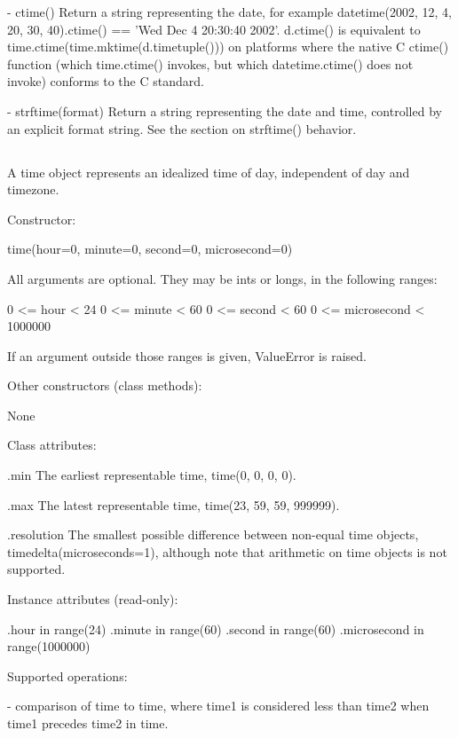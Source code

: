 {  - ctime()
    Return a string representing the date, for example
    datetime(2002, 12, 4, 20, 30, 40).ctime() == 'Wed Dec  4 20:30:40 2002'.
    d.ctime() is equivalent to time.ctime(time.mktime(d.timetuple()))
    on platforms where the native C ctime() function (which time.ctime()
    invokes, but which datetime.ctime() does not invoke) conforms to the
    C standard.

  - strftime(format)
    Return a string representing the date and time, controlled by an
    explicit format string.  See the section on strftime() behavior.


\subsection{ \label{datetime-time}}

A time object represents an idealized time of day, independent of day
and timezone.

Constructor:

    time(hour=0, minute=0, second=0, microsecond=0)

    All arguments are optional.  They may be ints or longs, in the
    following ranges:

        0 <= hour < 24
        0 <= minute < 60
        0 <= second < 60
        0 <= microsecond < 1000000

    If an argument outside those ranges is given, ValueError is raised.

Other constructors (class methods):

    None

Class attributes:

    .min
        The earliest representable time, time(0, 0, 0, 0).

    .max
        The latest representable time, time(23, 59, 59, 999999).

    .resolution
        The smallest possible difference between non-equal time
        objects, timedelta(microseconds=1), although note that
        arithmetic on time objects is not supported.

Instance attributes (read-only):

    .hour           in range(24)
    .minute         in range(60)
    .second         in range(60)
    .microsecond    in range(1000000)

Supported operations:

    - comparison of time to time, where time1 is considered
      less than time2 when time1 precedes time2 in time.

}
